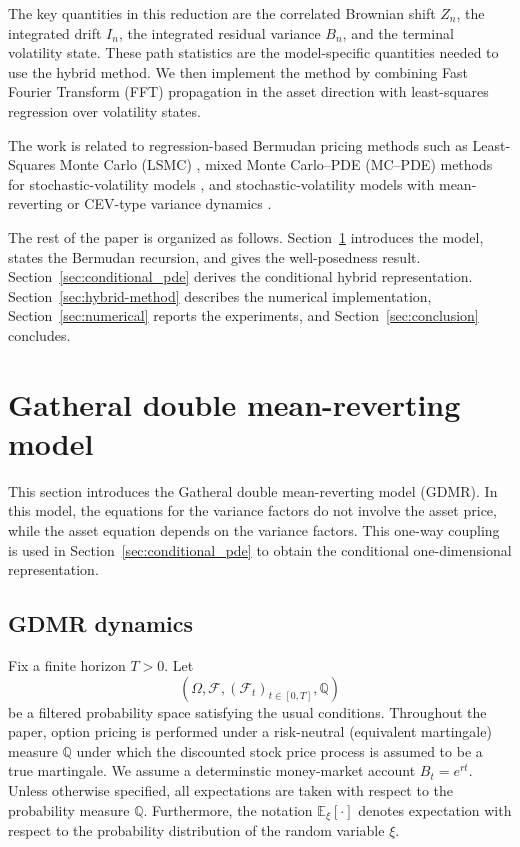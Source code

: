 \documentclass[pdflatex,sn-mathphys-num]{sn-jnl}
\theoremstyle{thmstyleone}%
\theoremstyle{thmstylethree}%
\theoremstyle{thmstyletwo}%
\newcommand{\E}{\mathbb E}
\newcommand{\Q}{\mathbb Q}
\newcommand{\F}{\mathcal F}
\begin{document}
The key quantities in this reduction are the correlated Brownian shift $Z_n$,
the integrated drift $I_n$, the integrated residual variance $B_n$, and the
terminal volatility state. These path statistics are the model-specific
quantities needed to use the hybrid method. We then implement the method by
combining Fast Fourier Transform (FFT) propagation in the asset direction with
least-squares regression over volatility states.

The work is related to regression-based Bermudan pricing methods such as
Least-Squares Monte Carlo (LSMC)
\cite{longstaff2001valuing,tsitsiklis2001regression,clement2002analysis},
mixed Monte Carlo--PDE (MC--PDE) methods for stochastic-volatility models
\cite{loeper2009mixed,lipp2013mixing,cozma2017mixed,farahany2020mixing}, and
stochastic-volatility models with mean-reverting or CEV-type variance dynamics
\cite{heston1993closedform,cir1985termstructure,gatheral2006volsurface,
bayer2013fast,cox1975cev,chan1992empirical,yamada1971uniqueness}.

The rest of the paper is organized as follows. Section~\ref{sec:model}
introduces the model, states the Bermudan recursion, and gives the
well-posedness result. Section~\ref{sec:conditional_pde} derives the conditional
hybrid representation. Section~\ref{sec:hybrid-method} describes the numerical
implementation, Section~\ref{sec:numerical} reports the experiments, and
Section~\ref{sec:conclusion} concludes.



\section{Gatheral double mean-reverting model}\label{sec:model}

This section introduces the Gatheral double mean-reverting model (GDMR). In this model, the equations for the variance factors do not involve the asset price, while
the asset equation depends on the variance factors. This one-way coupling is
used in Section~\ref{sec:conditional_pde} to obtain the conditional
one-dimensional representation.

\subsection{GDMR dynamics}

Fix a finite horizon $T>0$. Let
$$
(\Omega,\F,(\F_t)_{t\in[0,T]},\Q)
$$
be a filtered probability space satisfying the usual conditions.  Throughout the paper, option pricing is performed under a risk-neutral (equivalent martingale) measure $\Q$ under which the discounted stock price process is assumed to be a true martingale. We assume a determinstic money-market account $B_t=e^{rt}$. Unless otherwise specified, all expectations are taken with respect to the probability measure $\Q$. Furthermore, the notation $\E_\xi[\cdot]$ denotes expectation with respect to the probability distribution of the random variable $\xi$.
\end{document}

